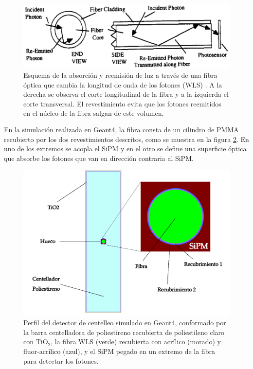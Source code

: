 \documentclass[12pt,oneside,openany,letter]{book}
\begin{document}
\begin{figure}[h!]
    \centering        \includegraphics[scale=0.5]{fiber_cladding.png}
   \caption[Esquema de la absorción y reemisión de luz a través de una fibra óptica]{Esquema de la absorción y reemisión de luz a través de una fibra óptica que cambia la longitud de onda de los fotones (WLS) \cite{Worstell-etal1994}. A la derecha se observa el corte longitudinal de la fibra y a la izquierda el corte transversal. El revestimiento evita que los fotones reemitidos en el n\'ucleo de la fibra salgan de este volumen.}\label{fiber_cladding}
\end{figure}


En la simulaci\'on realizada en Geant4, la fibra consta de un cilindro de PMMA recubierto por los dos revestimientos descritos, como se muestra en la figura \ref{perfil_sipm}. En uno de los extremos se acopla el SiPM y en el otro se define una superficie óptica que absorbe los fotones que van en dirección contraria al SiPM. 

\begin{figure}[h!]
    \centering        \includegraphics[scale=0.35]{perfil_sipm.png}
   \caption[Perfil del detector de centelleo simulado en GEANT4]{Perfil del detector de centelleo simulado en Geant4, conformado por la barra centelladora de poliestireno recubierta de poliestileno claro con $\text{TiO}_{2}$, la fibra WLS (verde) recubierta con acrílico (morado) y fluor-acrílico (azul), y el SiPM pegado en un extremo de la fibra para detectar los fotones.}\label{perfil_sipm}
\end{figure}
\end{document}
